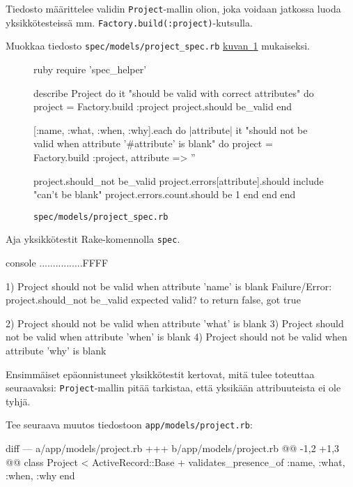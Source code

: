 \documentclass{article}
\newenvironment{myfigure}[1][tbp]{
  \begin{figure}[#1]
    \centering
    \begin{lrbox}{\myfigurebox}
      \begin{minipage}{\textwidth}
}{
      \end{minipage}
    \end{lrbox}
    \colorbox{blue!4}{\usebox{\myfigurebox}}
  \end{figure}
}
\newcommand{\myref}[2]{\hyperref[#2]{#1~\ref*{#2}}}
\begin{document}
Tiedosto määrittelee validin \texttt{Project}-mallin olion, joka voidaan
jatkossa luoda yksikkötesteissä mm. \texttt{Factory.build(:project)}-kutsulla.

\begin{samepage}
Muokkaa tiedosto \texttt{spec/models/project\_spec.rb}
\myref{kuvan}{fig:project-model-spec-00} mukaiseksi.

\begin{myfigure}[H]
\caption{\texttt{spec/models/project\_spec.rb}}
\label{fig:project-model-spec-00}

\begin{pygmented}{ruby}
require 'spec_helper'

describe Project do
  it "should be valid with correct attributes" do
    project = Factory.build :project
    project.should be_valid
  end

  [:name, :what, :when, :why].each do |attribute|
    it "should not be valid when attribute '#{attribute}' is blank" do
      project = Factory.build :project, attribute => ''

      project.should_not be_valid
      project.errors[attribute].should include "can't be blank"
      project.errors.count.should be 1
    end
  end
end
\end{pygmented}
\end{myfigure}
\end{samepage}

\begin{samepage}
Aja yksikkötestit Rake-komennolla \texttt{spec}.

\begin{pygmented}{console}
................FFFF

1) Project should not be valid when attribute 'name' is blank
    Failure/Error: project.should_not be_valid
    expected valid? to return false, got true

2) Project should not be valid when attribute 'what' is blank
3) Project should not be valid when attribute 'when' is blank
4) Project should not be valid when attribute 'why' is blank
\end{pygmented}
\end{samepage}

Ensimmäiset epäonnistuneet yksikkötestit kertovat, mitä tulee toteuttaa
seuraavaksi: \texttt{Project}-mallin pitää tarkistaa, että yksikään
attribuuteista ei ole tyhjä.

\begin{samepage}
Tee seuraava muutos tiedostoon \texttt{app/models/project.rb}:

\begin{pygmented}{diff}
--- a/app/models/project.rb
+++ b/app/models/project.rb
@@ -1,2 +1,3 @@
 class Project < ActiveRecord::Base
+  validates_presence_of :name, :what, :when, :why
 end
\end{pygmented}
\end{samepage}
\end{document}
